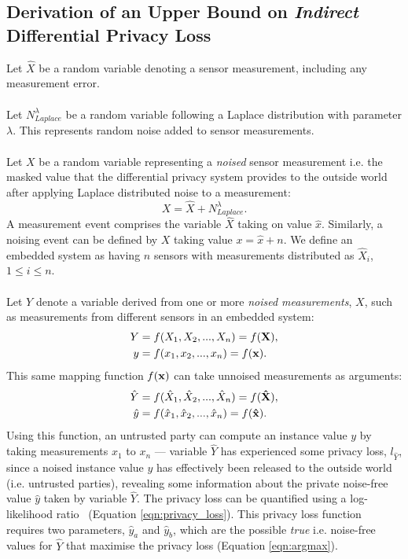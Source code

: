 \documentclass[12pt]{article}
\begin{document}
\begin{appendix}
  \section{Derivation of an Upper Bound on \textit{Indirect} Differential Privacy Loss} \label{appendix:diff_priv_loss}
    Let $\hat{X}$ be a random variable denoting a sensor measurement, including any measurement error.
    \\
    \\
    Let $N_{Laplace}^\lambda$ be a random variable following a Laplace distribution with parameter $\lambda$. This represents random noise added to sensor measurements.
    \\
    \\
    Let $X$ be a random variable representing a \textit{noised} sensor measurement i.e. the masked value that the differential privacy system provides to the outside world after applying Laplace distributed noise to a measurement:
    \begin{equation}
      X = \hat{X} + N_{Laplace}^\lambda.
    \end{equation}
    A measurement event comprises the variable $\hat{X}$ taking on value $\hat{x}$. Similarly, a noising event can be defined by $X$ taking value $x = \hat{x} + n$. We define an embedded system as having $n$ sensors with measurements distributed as $\hat{X}_i$, $1 \leq i \leq n$.
    \\
    \\
    Let $Y$ denote a variable derived from one or more \textit{noised measurements}, $X$, such as measurements from different sensors in an embedded system:
    \begin{align*}
      Y & = f(X_1, X_2, ..., X_n) = f(\bf{X}),\\
      y & = f(x_{1}, x_{2}, ..., x_{n}) = f(\bf{x}).
    \end{align*}
    This same mapping function $f(\bf{x})$ can take unnoised measurements as arguments:
    \begin{align*}
      \hat{Y} & = f(\hat{X}_1, \hat{X}_2, ..., \hat{X}_n) = f(\bf{\hat{X}}),\\
      \hat{y} & = f(\hat{x}_{1}, \hat{x}_{2}, ..., \hat{x}_{n}) = f(\bf{\hat{x}}).
    \end{align*}
    Using this function, an untrusted party can compute an instance value $y$ by taking measurements $x_{1}$ to $x_{n}$ --- variable $\hat{Y}$ has experienced some privacy loss, $l_{\hat{Y}}$, since a noised instance value $y$ has effectively been released to the outside world (i.e. untrusted parties), revealing some information about the private noise-free value $\hat{y}$ taken by variable $\hat{Y}$. The privacy loss can be quantified using a log-likelihood ratio~\cite{Choi2018GuaranteeingLD} (Equation \ref{eqn:privacy_loss}). This privacy loss function requires two parameters,  $\hat{y}_a$ and $\hat{y}_b$, which are the possible \textit{true} i.e. noise-free values for $\hat{Y}$ that maximise the privacy loss (Equation \ref{eqn:argmax}).

\end{appendix}
\end{document}
